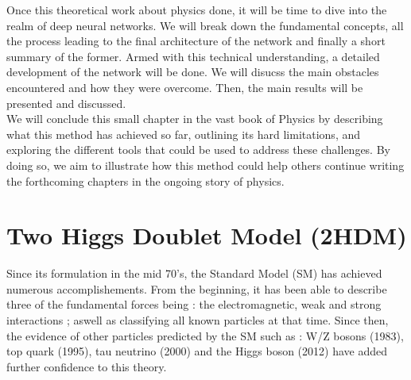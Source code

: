 \documentclass [12pt] {article}
\numberwithin{equation}{section} %
\numberwithin{figure}{section}   %
\begin{document}
Once this theoretical work about physics done, it will be time to dive into the realm of deep neural networks. We will break down the fundamental concepts, all the process leading to the final architecture of the network and finally a short summary of the former. Armed with this technical understanding, a detailed development of the network will be done. We will disucss the main obstacles encountered and how they were overcome. Then, the main results will be presented and discussed.\\

We will conclude this small chapter in the vast book of Physics by describing what this method has achieved so far, outlining its hard limitations, and exploring the different tools that could be used to address these challenges. By doing so, we aim to illustrate how this method could help others continue writing the forthcoming chapters in the ongoing story of physics.



\newpage

\section{Two Higgs Doublet Model (2HDM)}

Since its formulation in the mid 70's, the Standard Model (SM) has achieved numerous accomplishements. From the beginning, it has been able to describe three of the fundamental forces being : the electromagnetic, weak and strong interactions ; aswell as classifying all known particles at that time. Since then, the evidence of other particles predicted by the SM such as : W/Z bosons (1983), top quark (1995), tau neutrino (2000) and the Higgs boson (2012) have added further confidence to this theory.\\
\end{document}
